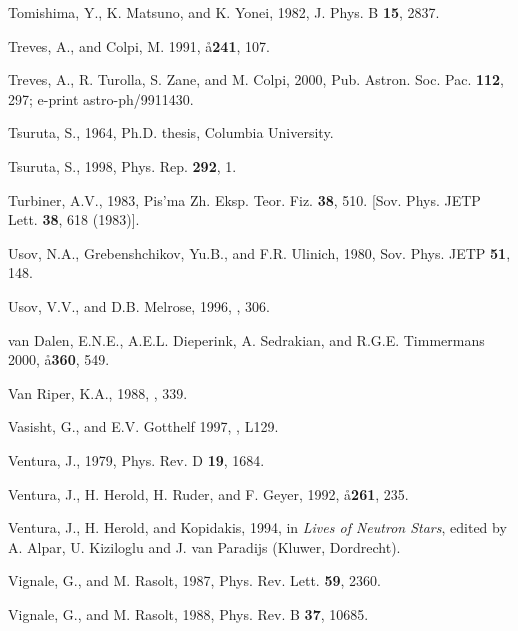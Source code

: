 \begin{references}
\harvarditem{}{}{}
Tomishima, Y., K. Matsuno, and K. Yonei, 1982, J. Phys. B {\bf 15}, 2837.

\harvarditem{}{}{}
Treves, A., and Colpi, M. 1991, \aa {\bf 241}, 107.

\harvarditem{}{}{}
Treves, A., R. Turolla, S. Zane, and M. Colpi, 2000, Pub. Astron. Soc. Pac.
{\bf 112}, 297; e-print astro-ph/9911430.

\harvarditem{}{}{}
Tsuruta, S., 1964, Ph.D. thesis, Columbia University.

\harvarditem{}{}{}
Tsuruta, S., 1998, Phys. Rep. {\bf 292}, 1.

\harvarditem{}{}{}
Turbiner, A.V., 1983, Pis'ma Zh. Eksp. Teor. Fiz. {\bf 38}, 510.
[Sov. Phys. JETP Lett. {\bf 38}, 618 (1983)].


\harvarditem{}{}{}
Usov, N.A., Grebenshchikov, Yu.B., and F.R. Ulinich, 1980, Sov.
Phys. JETP {\bf 51}, 148.

\harvarditem{}{}{}
Usov, V.V., and D.B. Melrose, 1996, , 306.

\harvarditem{}{}{}
van Dalen, E.N.E., A.E.L. Dieperink, A. Sedrakian, and R.G.E. Timmermans 2000,
\aa {\bf 360}, 549.

\harvarditem{}{}{}
Van Riper, K.A., 1988, , 339.

\harvarditem{}{}{}
Vasisht, G., and E.V. Gotthelf 1997, \apj, L129.

\harvarditem{}{}{}
Ventura, J., 1979, Phys. Rev. D {\bf 19}, 1684.

\harvarditem{}{}{}
Ventura, J., H. Herold, H. Ruder, and F. Geyer, 1992, \aa {\bf 261}, 235.

\harvarditem{}{}{}
Ventura, J., H. Herold, and Kopidakis, 1994,
in {\it Lives of Neutron Stars}, edited by A. Alpar, U. Kiziloglu and 
J. van Paradijs (Kluwer, Dordrecht).

\harvarditem{}{}{}
Vignale, G., and M. Rasolt, 1987, Phys. Rev. Lett. {\bf 59}, 2360.

\harvarditem{}{}{}
Vignale, G., and M. Rasolt, 1988, Phys. Rev. B {\bf 37}, 10685.


\end{references}
